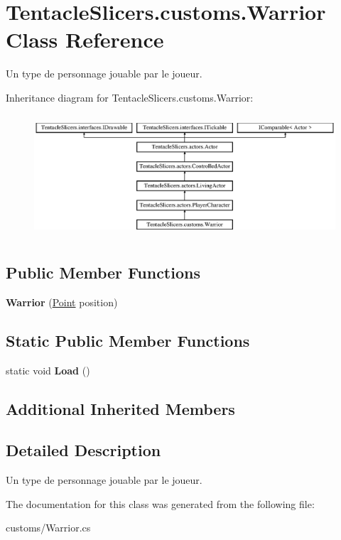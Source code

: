 \hypertarget{class_tentacle_slicers_1_1customs_1_1_warrior}{}\section{Tentacle\+Slicers.\+customs.\+Warrior Class Reference}
\label{class_tentacle_slicers_1_1customs_1_1_warrior}


Un type de personnage jouable par le joueur.  


Inheritance diagram for Tentacle\+Slicers.\+customs.\+Warrior\+:\begin{figure}[H]
\begin{center}
\leavevmode
\includegraphics[height=4.590164cm]{class_tentacle_slicers_1_1customs_1_1_warrior}
\end{center}
\end{figure}
\subsection*{Public Member Functions}
\begin{DoxyCompactItemize}
\item 
\mbox{\label{class_tentacle_slicers_1_1customs_1_1_warrior_a66a817e222134bf02ec01bac78f5d8f7}} 
{\bfseries Warrior} (\hyperlink{class_tentacle_slicers_1_1general_1_1_point}{Point} position)
\end{DoxyCompactItemize}
\subsection*{Static Public Member Functions}
\begin{DoxyCompactItemize}
\item 
\mbox{\label{class_tentacle_slicers_1_1customs_1_1_warrior_a397f75cbb59600f7c9867704a6a1cf5d}} 
static void {\bfseries Load} ()
\end{DoxyCompactItemize}
\subsection*{Additional Inherited Members}


\subsection{Detailed Description}
Un type de personnage jouable par le joueur. 



The documentation for this class was generated from the following file\+:\begin{DoxyCompactItemize}
\item 
customs/Warrior.\+cs\end{DoxyCompactItemize}
